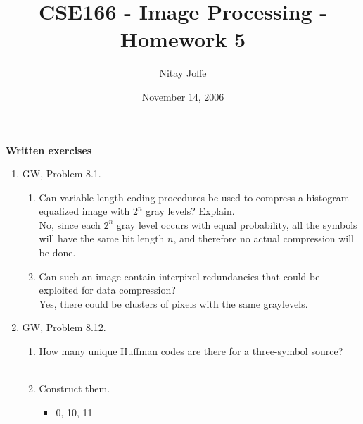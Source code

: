 \documentclass{article}
\title{CSE166 - Image Processing - Homework 5}
\author{Nitay Joffe}
\date{November 14, 2006}
\begin{document}
\maketitle

\noindent
{\bf Written exercises}
\begin{enumerate}
  \item GW, Problem 8.1.
  \begin{enumerate}
    \item Can variable-length coding procedures be used to compress a histogram
          equalized image with $2^n$ gray levels? Explain.\\
          \linebreak
          No, since each $2^n$ gray level occurs with equal probability, all
          the symbols will have the same bit length $n$, and therefore no actual
          compression will be done.\\
    \item Can such an image contain interpixel redundancies that could be
          exploited for data compression?\\
          \linebreak
          Yes, there could be clusters of pixels with the same graylevels.\\
  \end{enumerate}

  \item GW, Problem 8.12.
  \begin{enumerate}
    \item How many unique Huffman codes are there for a three-symbol source?\\
          \\
    \item Construct them.\\
          \begin{itemize}
            \item 0, 10, 11\\
          \end{itemize}
  \end{enumerate}


\end{enumerate}
\end{document}

